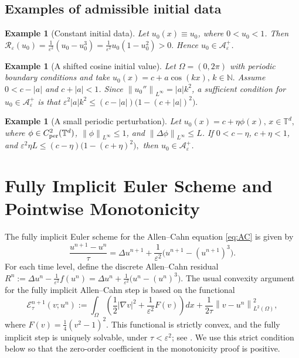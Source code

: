 \documentclass[final, 3p, times]{elsarticle}%
\newcommand{\T}{\mathbb T}
\newcommand{\eps}{\varepsilon}
\newcommand{\Reps}{\mathcal R_\varepsilon}
\newcommand{\Aepsp}{\mathcal A_\varepsilon^+}
\newcommand{\Aeps}{\Aepsp}
\newcommand{\norm}[1]{\left\lVert #1\right\rVert}
\newcommand{\dt}{\tau}
\newtheorem{example}[theorem]{Example}
\begin{document}
\subsection{Examples of admissible initial data}

\begin{example}[Constant initial data]
Let \(u_0(x)\equiv u_0\), where \(0<u_0<1\). Then
\(
    \Reps(u_0)=\frac{1}{\eps^2}(u_0-u_0^3)
    =\frac{1}{\eps^2}u_0(1-u_0^2)>0.
\)
Hence \(u_0\in\Aeps\).
\end{example}

\begin{example}[A shifted cosine initial value]
Let \(\Omega=(0,2\pi)\) with periodic boundary conditions and take
$u_0(x)=c+a\cos(kx),\, k\in\mathbb N.$
Assume \(0<c-|a|\) and \(c+|a|<1\). Since \(\norm{u_0''}_{L^\infty}=|a|k^2\), a sufficient condition for \(u_0\in\Aeps\) is
that $\eps^2 |a|k^2\le (c-|a|)\bigl(1-(c+|a|)^2\bigr).$
\end{example}

\begin{example}[A small periodic perturbation]
Let
$u_0(x)=c+\eta\phi(x),\, x\in\T^d,
$
where \(\phi\in C^2_{\rm per}(\T^d)\), \(\norm{\phi}_{L^\infty}\le1\), and \(\norm{\Delta\phi}_{L^\infty}\le L\). If \(0<c-\eta\), \(c+\eta<1\), and
$\eps^2\eta L\le (c-\eta)\bigl(1-(c+\eta)^2\bigr),$
then \(u_0\in\Aeps\).
\end{example}


\section{Fully Implicit Euler Scheme and Pointwise Monotonicity}
\label{sec:IE}


The fully implicit Euler scheme for the Allen--Cahn equation \eqref{eq:AC} is given by
\begin{equation}
    \frac{u^{n+1}-u^n}{\dt}
    =\Delta u^{n+1}+\frac{1}{\eps^2}\bigl(u^{n+1}-(u^{n+1})^3\bigr).
    \label{eq:IE}
\end{equation}
For each time level, define the discrete Allen--Cahn residual
$ R^n:=\Delta u^n-\frac{1}{\eps^2}f(u^n)
    =\Delta u^n+\frac{1}{\eps^2}\bigl(u^n-(u^n)^3\bigr).$
The usual convexity argument for the fully implicit Allen--Cahn step is based on the functional
\begin{equation}
    \mathcal E_{\dt}^{n+1}(v;u^n)
    :=
    \int_\Omega\left(\frac12|\nabla v|^2+\frac{1}{\eps^2}F(v)\right)dx
    +\frac{1}{2\dt}\norm{v-u^n}_{L^2(\Omega)}^2,
    \label{eq:IE-functional}
\end{equation}
where \(F(v)=\frac14(v^2-1)^2\). This functional is strictly convex, and the fully implicit step is uniquely solvable, under \(\dt<\eps^2\); see \cite{xu2019stability}. We use this strict condition below so that the zero-order coefficient in the monotonicity proof is positive.
\end{document}
